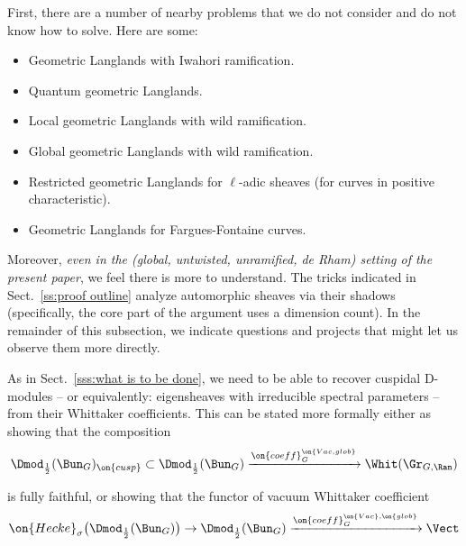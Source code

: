 \documentclass[9pt]{amsart}
\theoremstyle{remark}
\theoremstyle{definition}
\theoremstyle{remark}
\newcommand{\secref}[1]{Sect.~\ref{#1}}
\numberwithin{equation}{section}
\begin{document}
\label{ss:not done}

\sssec{}\label{sss:neighbors}

First, there are a number of nearby problems that we do not consider
and do not know how to solve. Here are some:

\begin{itemize}

\item Geometric Langlands with Iwahori ramification.

\item Quantum geometric Langlands.

\item Local geometric Langlands with wild ramification. 

\item Global geometric Langlands with wild ramification.

\item Restricted geometric Langlands for $\ell$-adic sheaves 
(for curves in positive characteristic).

\item Geometric Langlands for Fargues-Fontaine curves.

\end{itemize}

\sssec{} Moreover, \emph{even in the (global, untwisted, unramified, de Rham) setting
of the present paper}, we feel there is more to understand.
The tricks indicated in \secref{ss:proof outline} analyze 
automorphic sheaves via their shadows (specifically, the core part of the argument uses a dimension count).
In the remainder of this subsection, 
we indicate questions and projects 
that might let us observe them more directly.


\sssec{} \label{sss:Whit ff}

As in \secref{sss:what is to be done}, we need to be able to recover
cuspidal D-modules -- or equivalently: eigensheaves with irreducible
spectral parameters -- from their Whittaker coefficients. This can be stated
more formally either as showing that the composition
\begin{equation}\label{eq:coeff-cusp}
\Dmod_{\frac{1}{2}}(\Bun_G)_{\on{cusp}} \subset 
\Dmod_{\frac{1}{2}}(\Bun_G) \xrightarrow{\on{coeff}^{\on{Vac,glob}}_G} 
\Whit(\Gr_{G,\Ran})
\end{equation}

\noindent is fully faithful, or showing that the functor of vacuum 
Whittaker coefficient
%
\[
\on{Hecke}_{\sigma}\big(\Dmod_{\frac{1}{2}}(\Bun_G)\big) \to 
\Dmod_{\frac{1}{2}}(\Bun_G) \xrightarrow{\on{coeff}_G^{\on{Vac},\on{glob}}} \Vect
\]
\end{document}
